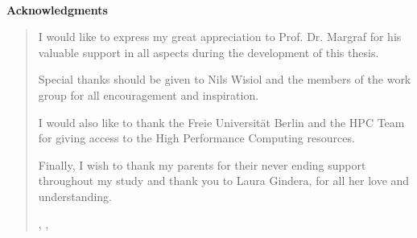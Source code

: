 
\newpage
\setcounter{page}{0}
\thispagestyle{empty}

~

\begin{center}
	\sffamily\bfseries\large Acknowledgments
\end{center}

\begin{quote}
\vspace{.1cm}

I would like to express my great appreciation to Prof. Dr. Margraf for his valuable support in all aspects during the development of this thesis.

Special thanks should be given to Nils Wisiol and the members of the \puf work group for all encouragement and inspiration.

I would also like to thank the Freie Universität Berlin and the HPC Team for giving access to the High Performance Computing resources.

Finally, I wish to thank my parents for their never ending support throughout my study and thank you to Laura Gindera, for all her love and understanding.

\begin{flushright}
	\myplace, \@date, \@author
\end{flushright}

\end{quote}
 
\begin{center}
	\sffamily\large \phantom{Acknowledgments}
\end{center}

~

\newpage